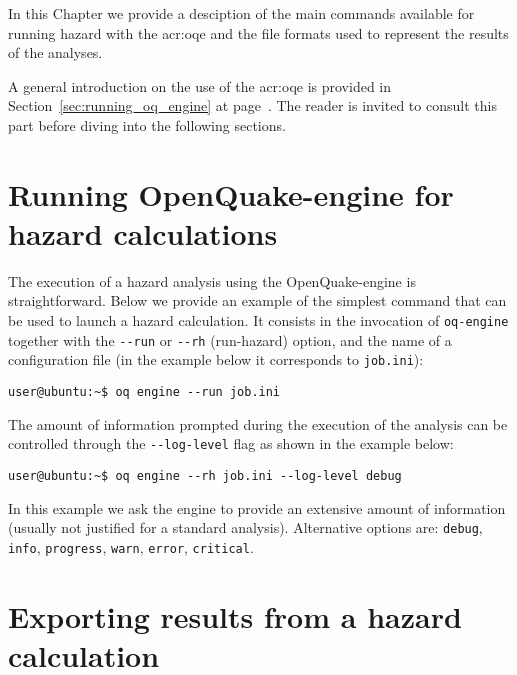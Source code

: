 In this Chapter we provide a desciption of the main commands available for
running hazard with the \gls{acr:oqe} and the file formats used to represent
the results of the analyses.

A general introduction on the use of the \glsdesc{acr:oqe} is provided in
Section~\ref{sec:running_oq_engine} at page~\pageref{sec:running_oq_engine}. The
reader is invited to consult this part before diving into the following
sections.


\section{Running OpenQuake-engine for hazard calculations}
\label{sec:running_hazard_calculations}

The execution of a hazard analysis using the OpenQuake-engine is
straightforward. Below we provide an example of the simplest command that can be
used to launch a hazard calculation. It consists in the invocation of \texttt
{oq-engine} together with the \texttt{-{}-run} or \texttt{-{}-rh} (run-hazard) option, and the name of a configuration file (in the example below it
corresponds to \texttt{job.ini}):

\begin{Verbatim}[frame=single, commandchars=\\\{\}, fontsize=\small]
user@ubuntu:~$ oq engine --run job.ini
\end{Verbatim}

The amount of information prompted during the execution of the analysis can be
controlled through the \texttt{-{}-log-level} flag as shown in the example below:

\begin{Verbatim}[frame=single, commandchars=\\\{\}, fontsize=\small]
user@ubuntu:~$ oq engine --rh job.ini --log-level debug
\end{Verbatim}

In this example we ask the engine to provide an extensive amount of information
(usually not justified for a standard analysis). Alternative options are:
\texttt{debug}, \texttt{info}, \texttt{progress}, \texttt{warn}, \texttt{error},
\texttt{critical}.


\section{Exporting results from a hazard calculation}
\label{sec:exporting_hazard_results}

